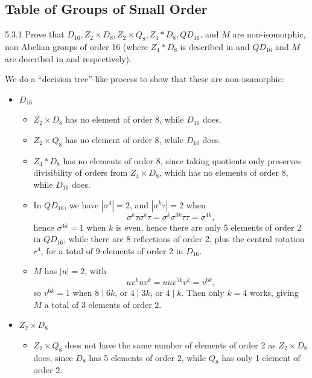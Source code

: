 \subsection{Table of Groups of Small Order}

\begin{exercise}{5.3.1}
    Prove that $D_{16}, Z_2 \times D_8, Z_2 \times Q_8, Z_4 \ast D_8, QD_{16}$, and $M$ are non-isomorphic, non-Abelian groups of order 16 (where $Z_4 \ast D_8$ is described in  and $QD_{16}$ and $M$ are described in  and  respectively).
\end{exercise}

\begin{sol}
    We do a ``decision tree''-like process to show that these are non-isomorphic:
    \begin{itemize}
        \item $D_{16}$
        \begin{itemize}
            \item $Z_2 \times D_8$ has no element of order 8, while $D_{16}$ does.
            \item $Z_2 \times Q_8$ has no element of order 8, while $D_{16}$ does.
            \item $Z_4 \ast D_8$ has no elements of order 8, since taking quotients only preserves divisibility of orders from $Z_4 \times D_8$, which has no elements of order 8, while $D_{16}$ does.
            \item In $QD_{16}$, we have $|\sigma^4| = 2$, and $|\sigma^k\tau| = 2$ when
            \[
            	\sigma^k\tau\sigma^k\tau = \sigma^k\sigma^{3k}\tau\tau = \sigma^{4k},
            \]
            hence $\sigma^{4k} = 1$ when $k$ is even, hence there are only 5 elements of order 2 in $QD_{16}$, while there are 8 reflections of order 2, plus the central rotation $r^4$, for a total of 9 elements of order 2 in $D_{16}$.
            \item $M$ has $|u| = 2$, with
            \[
            	uv^kuv^k = uuv^{5k}v^k = v^{6k},
            \]
            so $v^{6k} = 1$ when $8 \mid 6k$, or $4 \mid 3k$, or $4 \mid k$.
	Then only $k = 4$ works, giving $M$ a total of 3 elements of order 2.
        \end{itemize}
        \item $Z_2 \times D_8$
        \begin{itemize}
            \item $Z_2 \times Q_8$ does not have the same number of elements of order 2 as $Z_2 \times D_8$ does, since $D_8$ has 5 elements of order 2, while $Q_8$ has only 1 element of order 2.

\end{itemize}
\end{itemize}
\end{sol}
